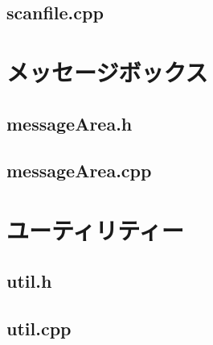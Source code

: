\documentclass[a4paper, 10pt]{ltjsarticle}
\begin{document}
\subsection{scanfile.cpp}

\clearpage

\section{メッセージボックス}
\subsection{messageArea.h}

\subsection{messageArea.cpp}

\clearpage

\section{ユーティリティー}
\subsection{util.h}

\subsection{util.cpp}

\end{document}
